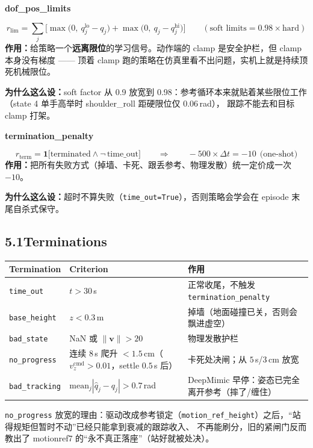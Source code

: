 \documentclass[11pt]{article}
\newcommand{\term}[1]{\texttt{\small #1}}
\newcommand{\rterm}[2]{%
  \Needspace*{7\baselineskip}\vspace{7pt}\noindent
  {\bfseries\ttfamily #1}\quad{\color{gray}\bfseries $w=#2$}\par\vspace{-3pt}}
\newcommand{\role}[1]{\noindent\textbf{作用：}#1\par}
\newcommand{\why}[1]{\noindent\textbf{为什么这么设：}#1\par}
\begin{document}
\rterm{dof\_pos\_limits}{-5.0}
\[
r_{\mathrm{lim}} = \sum_j \Big[\max\big(0,\ q^{\mathrm{lo}}_j - q_j\big) + \max\big(0,\ q_j - q^{\mathrm{hi}}_j\big)\Big]
\qquad (\text{soft limits} = 0.98\times\text{hard})
\]
\role{给策略一个\textbf{远离限位}的学习信号。动作端的 clamp 是安全护栏，但 clamp 本身没有梯度 ——
顶着 clamp 跑的策略在仿真里看不出问题，实机上就是持续顶死机械限位。}
\why{soft factor 从 0.9 放宽到 0.98：参考循环本来就贴着某些限位工作（state 4 单手高举时 shoulder\_roll 距硬限位仅 $0.06$\,rad），
跟踪不能去和目标 clamp 打架。}

\rterm{termination\_penalty}{-500}
\[
r_{\mathrm{term}} = \mathbf 1\big[\text{terminated} \wedge \neg\,\text{time\_out}\big]
\qquad\Longrightarrow\qquad
-500 \times \Delta t = -10 \ \ \text{(one-shot)}
\]
\role{把所有失败方式（掉墙、卡死、跟丢参考、物理发散）统一定价成一次 $-10$。}
\why{超时不算失败（\term{time\_out=True}），否则策略会学会在 episode 末尾自杀式保守。}

\subsection*{5.1\quad Terminations}
\begin{center}
\begin{tabular}{@{}lll@{}}
\toprule
Termination & Criterion & 作用 \\
\midrule
\term{time\_out} & $t > 30$\,s & 正常收尾，不触发 \term{termination\_penalty} \\
\term{base\_height} & $z < 0.3$\,m & 掉墙（地面碰撞已关，否则会飘进虚空） \\
\term{bad\_state} & NaN 或 $\lVert\bm v\rVert > 20$ & 物理发散护栏 \\
\term{no\_progress} & 连续 $8$\,s 爬升 $< 1.5$\,cm（$v_z^{\mathrm{cmd}}>0.01$，settle $0.5$\,s 后） &
  卡死处决闸；从 $5$\,s/$3$\,cm 放宽 \\
\term{bad\_tracking} & $\mathrm{mean}_j|\hat q_j - q_j| > 0.7$\,rad & DeepMimic 早停：姿态已完全离开参考（摔了/缠住） \\
\bottomrule
\end{tabular}
\end{center}
\term{no\_progress} 放宽的理由：驱动改成参考锁定（\term{motion\_ref\_height}）之后，“站得规矩但暂时不动”已经只能拿到衰减的跟踪收入、
不再能刷分，旧的紧闸门反而教出了 motionref7 的“永不真正落座”（站好就被处决）。
\end{document}
